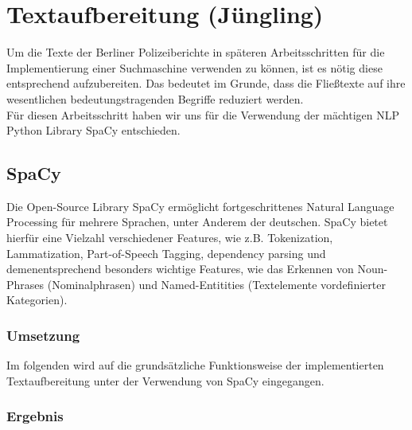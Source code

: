 \chapter{Textaufbereitung \small(Jüngling)}

Um die Texte der Berliner Polizeiberichte in späteren Arbeitsschritten für die Implementierung einer Suchmaschine verwenden zu können, ist es nötig diese entsprechend aufzubereiten. Das bedeutet im Grunde, dass die Fließtexte auf ihre wesentlichen bedeutungstragenden Begriffe reduziert werden. 
\\Für diesen Arbeitsschritt haben wir uns für die Verwendung der mächtigen NLP Python Library SpaCy entschieden. 

\section{SpaCy}
Die Open-Source Library SpaCy ermöglicht fortgeschrittenes Natural Language Processing für mehrere Sprachen, unter Anderem der deutschen. SpaCy bietet hierfür eine Vielzahl verschiedener Features, wie z.B. Tokenization, Lammatization, Part-of-Speech Tagging, dependency parsing und demenentsprechend besonders wichtige Features, wie das Erkennen von Noun-Phrases (Nominalphrasen) und Named-Entitities (Textelemente vordefinierter Kategorien). 

\subsection{Umsetzung}
Im folgenden wird auf die grundsätzliche Funktionsweise der implementierten Textaufbereitung unter der Verwendung von SpaCy eingegangen.

\subsection{Ergebnis}





